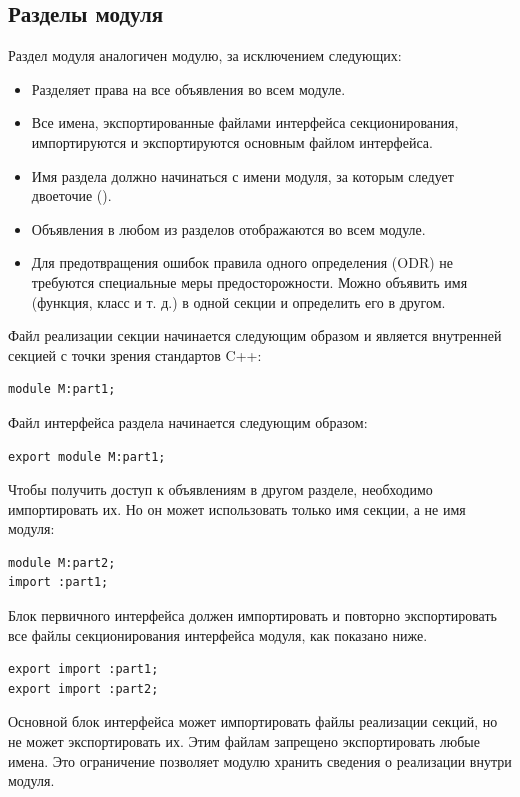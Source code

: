 \subsection{Разделы модуля}

Раздел модуля аналогичен модулю, за исключением следующих:
\begin{itemize}
    \item Разделяет права на все объявления во всем модуле.
    \item Все имена, экспортированные файлами интерфейса секционирования, импортируются и экспортируются основным файлом интерфейса.
    \item Имя раздела должно начинаться с имени модуля, за которым следует двоеточие (\mverb{:}).
    \item Объявления в любом из разделов отображаются во всем модуле.
    \item Для предотвращения ошибок правила одного определения (ODR) не требуются специальные меры предосторожности. Можно объявить имя (функция, класс и т. д.) в одной секции и определить его в другом.
\end{itemize}

Файл реализации секции начинается следующим образом и является внутренней секцией с точки зрения стандартов C++:
\begin{verbatim}
module M:part1;
\end{verbatim}

Файл интерфейса раздела начинается следующим образом:
\begin{verbatim}
export module M:part1;
\end{verbatim}

Чтобы получить доступ к объявлениям в другом разделе, необходимо импортировать их. Но он может использовать только имя секции, а не имя модуля:
\begin{verbatim}
module M:part2;
import :part1;
\end{verbatim}

Блок первичного интерфейса должен импортировать и повторно экспортировать все файлы секционирования интерфейса модуля, как показано ниже.
\begin{verbatim}
export import :part1;
export import :part2;
\end{verbatim}

Основной блок интерфейса может импортировать файлы реализации секций, но не может экспортировать их. Этим файлам запрещено экспортировать любые имена. Это ограничение позволяет модулю хранить сведения о реализации внутри модуля.

